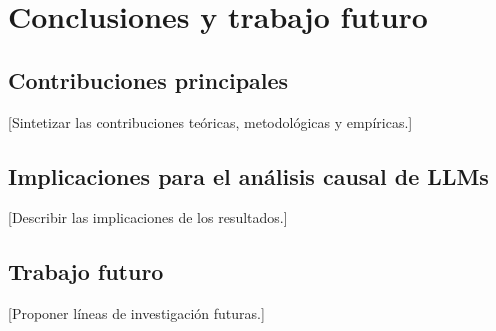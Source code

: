 \chapter{Conclusiones y trabajo futuro}

\section{Contribuciones principales}
[Sintetizar las contribuciones teóricas, metodológicas y empíricas.]

\section{Implicaciones para el análisis causal de LLMs}
[Describir las implicaciones de los resultados.]

\section{Trabajo futuro}
[Proponer líneas de investigación futuras.]
